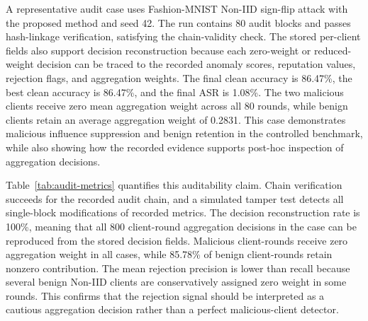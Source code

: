 \documentclass[preprint,12pt]{elsarticle}
\begin{document}
A representative audit case uses Fashion-MNIST Non-IID sign-flip attack with the proposed method and seed 42. The run contains 80 audit blocks and passes hash-linkage verification, satisfying the chain-validity check. The stored per-client fields also support decision reconstruction because each zero-weight or reduced-weight decision can be traced to the recorded anomaly scores, reputation values, rejection flags, and aggregation weights. The final clean accuracy is 86.47\%, the best clean accuracy is 86.47\%, and the final ASR is 1.08\%. The two malicious clients receive zero mean aggregation weight across all 80 rounds, while benign clients retain an average aggregation weight of 0.2831. This case demonstrates malicious influence suppression and benign retention in the controlled benchmark, while also showing how the recorded evidence supports post-hoc inspection of aggregation decisions.

Table~\ref{tab:audit-metrics} quantifies this auditability claim. Chain verification succeeds for the recorded audit chain, and a simulated tamper test detects all single-block modifications of recorded metrics. The decision reconstruction rate is 100\%, meaning that all 800 client-round aggregation decisions in the case can be reproduced from the stored decision fields. Malicious client-rounds receive zero aggregation weight in all cases, while 85.78\% of benign client-rounds retain nonzero contribution. The mean rejection precision is lower than recall because several benign Non-IID clients are conservatively assigned zero weight in some rounds. This confirms that the rejection signal should be interpreted as a cautious aggregation decision rather than a perfect malicious-client detector.
\end{document}
